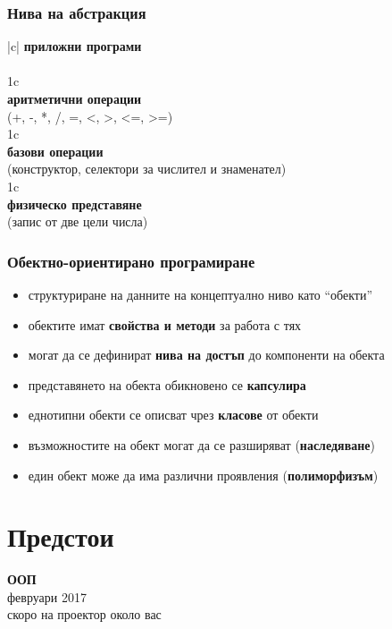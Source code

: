 \documentclass{beamer}
\begin{document}
\begin{frame}
  \frametitle{Нива на абстракция}

  \renewcommand{\bua}{\bigg\uparrow}

  \begin{center}
    \begin{tabular}{|c|}
      \hline
      \textbf{приложни програми}\\
      \\
      \hline
      \multicolumn 1c\bua\\
      \hline
      \textbf{аритметични операции}\\
      (+, -, *, /, =, <, >, <=, >=)\\
      \hline
      \multicolumn 1c\bua\\
      \hline
      \textbf{базови операции}\\
      (конструктор, селектори за числител и знаменател)\\
      \hline
      \multicolumn 1c\bua\\
      \hline
      \textbf{физическо представяне}\\
      (запис от две цели числа)\\
      \hline
    \end{tabular}
  \end{center}
\end{frame}

\begin{frame}
  \frametitle{Обектно-ориентирано програмиране}

  \begin{itemize}
  \item структуриране на данните на концептуално ниво като ``обекти''
  \item обектите имат \textbf{свойства и методи} за работа с тях
  \item могат да се дефинират \textbf{нива на достъп} до компоненти на обекта
  \item представянето на обекта обикновено се \textbf{капсулира}
  \item еднотипни обекти се описват чрез \textbf{класове} от обекти
  \item възможностите на обект могат да се разширяват (\textbf{наследяване})
  \item един обект може да има различни проявления (\textbf{полиморфизъм})
  \end{itemize}
\end{frame}

\section*{Предстои}


\begin{frame}
  \begin{center}
    \Huge
    \alert{\textbf{ООП}}\\[0.5em]
    \Large
    февруари 2017\\[2em]
    \pause
    \small
    скоро на проектор около вас
  \end{center}
\end{frame}
\end{document}
